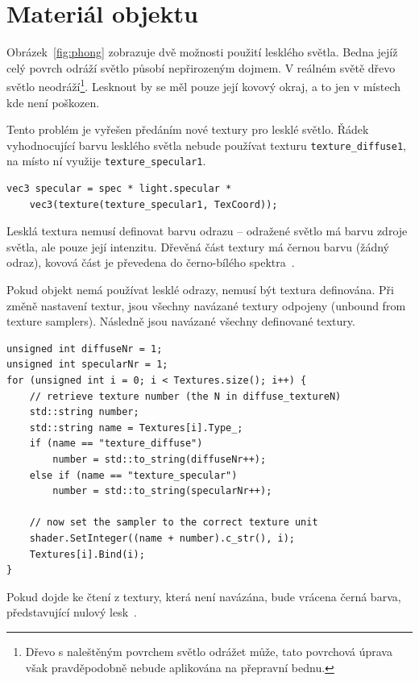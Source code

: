\documentclass[thesis=M,czech]{FITthesis}[2019/12/23]
\begin{document}
\section{Materiál objektu}

Obrázek~\ref{fig:phong} zobrazuje dvě možnosti použití lesklého světla. Bedna jejíž celý povrch odráží světlo působí nepřirozeným dojmem. V reálném světě dřevo světlo neodráží\footnote{Dřevo s naleštěným povrchem světlo odrážet může, tato povrchová úprava však pravděpodobně nebude aplikována na přepravní bednu.}. Lesknout by se měl pouze její kovový okraj, a to jen v místech kde není poškozen.

Tento problém je vyřešen předáním nové textury pro lesklé světlo. Řádek vyhodnocující barvu lesklého světla nebude používat texturu \texttt{texture\_diffuse1}, na místo ní využije \texttt{texture\_specular1}.

\begin{verbatim}
vec3 specular = spec * light.specular * 
    vec3(texture(texture_specular1, TexCoord));
\end{verbatim}

Lesklá textura nemusí definovat barvu odrazu -- odražené světlo má barvu zdroje světla, ale pouze její intenzitu. Dřevěná část textury má černou barvu (žádný odraz), kovová část je převedena do černo-bílého spektra~\cite{lopgl_light_maps}.

Pokud objekt nemá používat lesklé odrazy, nemusí být textura definována. Při změně nastavení textur, jsou všechny navázané textury odpojeny (unbound from texture samplers). Následně jsou navázané všechny definované textury.

\begin{verbatim}
unsigned int diffuseNr = 1;
unsigned int specularNr = 1;
for (unsigned int i = 0; i < Textures.size(); i++) {
    // retrieve texture number (the N in diffuse_textureN)
    std::string number;
    std::string name = Textures[i].Type_;
    if (name == "texture_diffuse")
        number = std::to_string(diffuseNr++);
    else if (name == "texture_specular")
        number = std::to_string(specularNr++);

    // now set the sampler to the correct texture unit
    shader.SetInteger((name + number).c_str(), i);
    Textures[i].Bind(i);
}
\end{verbatim}

Pokud dojde ke čtení z textury, která není navázána, bude vrácena černá barva, představující nulový lesk~\cite{unbound_texture}.
\end{document}
